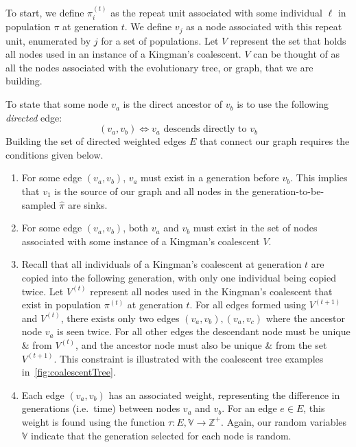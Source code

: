 To start, we define $\pi^{(t)}_i$ as the repeat unit associated with some individual $\ell$ in population $\pi$ at
generation $t$.
We define $v_j$ as a node associated with this repeat unit, enumerated by $j$ for a set of populations.
Let $V$ represent the set that holds all nodes used in an instance of a Kingman's coalescent.
$V$ can be thought of as all the nodes associated with the evolutionary tree, or graph, that we are building.

To state that some node $v_a$ is the direct ancestor of $v_b$ is to use the following \emph{directed} edge:
\begin{equation}
    (v_a, v_b) \Leftrightarrow v_a \text{ descends directly to } v_b
\end{equation}
Building the set of directed weighted edges $E$ that connect our graph requires the conditions given below.
\begin{enumerate}
    \item For some edge $(v_a, v_b)$, $v_a$ must exist in a generation before $v_b$.
        This implies that $v_1$ is the source of our graph and all nodes in the generation-to-be-sampled $\hat{\pi}$ are
        sinks.
    \item For some edge $(v_a, v_b)$, both $v_a$ and $v_b$ must exist in the set of nodes associated with some instance
        of a Kingman's coalescent $V$.
    \item Recall that all individuals of a Kingman's coalescent at generation $t$ are copied into the following
        generation, with only one individual being copied twice.
        Let $V^{(t)}$ represent all nodes used in the Kingman's coalescent that exist in population $\pi^{(t)}$ at
        generation $t$.
        For all edges formed using $V^{(t+1)}$ and $V^{(t)}$, there exists only two edges $(v_a, v_b), (v_a, v_c)$ where
        the ancestor node $v_a$ is seen twice.
        For all other edges the descendant node must be unique \& from $V^{(t)}$, and the ancestor node must also be
        unique \& from the set $V^{(t+1)}$.
        This constraint is illustrated with the coalescent tree examples in~\autoref{fig:coalescentTree}.
    \item Each edge $(v_a, v_b)$ has an associated weight, representing the difference in generations (i.e.\ time)
        between nodes $v_a$ and $v_b$.
        For an edge $e \in E$, this weight is found using the function $\tau : E, \mathbb{V} \rightarrow \mathbb{Z}^+$.
        Again, our random variables $\mathbb{V}$ indicate that the generation selected for each node is random.
\end{enumerate}

